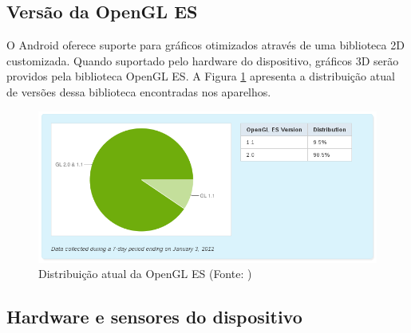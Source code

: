 \subsection{Versão da OpenGL ES}

O Android oferece suporte para gráficos otimizados através de uma biblioteca 2D 
customizada. Quando suportado pelo hardware do dispositivo, gráficos 3D serão 
providos pela biblioteca OpenGL ES. A Figura \ref{distribuicao_opengl} apresenta 
a distribuição atual de versões dessa biblioteca encontradas nos aparelhos.

\begin{figure}[h]
    \centering
    \includegraphics[width=15cm]{img/opengl}
    \caption[Distribuição atual da OpenGL ES]{Distribuição atual da OpenGL ES (Fonte: \cite{opengl_versions})}
    \label{distribuicao_opengl}
\end{figure}


\subsection{Hardware e sensores do dispositivo}

